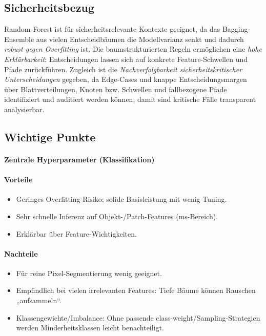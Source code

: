 \subsection{Sicherheitsbezug}
Random Forest ist für sicherheitsrelevante Kontexte geeignet, da das Bagging-Ensemble 
aus vielen Entscheidbäumen die Modellvarianz senkt und dadurch \emph{robust gegen Overfitting} 
ist. Die baumstrukturierten Regeln ermöglichen eine \emph{hohe Erklärbarkeit}: Entscheidungen lassen 
sich auf konkrete Feature-Schwellen und Pfade zurückführen. Zugleich ist die 
\emph{Nachverfolgbarkeit sicherheitskritischer Unterscheidungen} gegeben, da Edge-Cases und knappe 
Entscheidungsmargen über Blattverteilungen, Knoten bzw. Schwellen und fallbezogene Pfade identifiziert 
und auditiert werden können; damit sind kritische Fälle transparent analysierbar.


\subsection{Wichtige Punkte}

\paragraph{Zentrale Hyperparameter (Klassifikation)}

\paragraph{Vorteile}
\begin{itemize}
  \item Geringes Overfitting-Risiko; solide Basisleistung mit wenig Tuning.
  \item Sehr schnelle Inferenz auf Objekt-/Patch-Features (ms-Bereich).
  \item Erklärbar über Feature-Wichtigkeiten.
\end{itemize}

\paragraph{Nachteile}
\begin{itemize}
  \item Für reine Pixel-Segmentierung wenig geeignet.
  \item Empfindlich bei vielen irrelevanten Features: Tiefe Bäume können Rauschen „aufsammeln“.
  \item Klassengewichte/Imbalance: Ohne passende class-weight/Sampling-Strategien werden Minderheitsklassen leicht benachteiligt.
\end{itemize}

